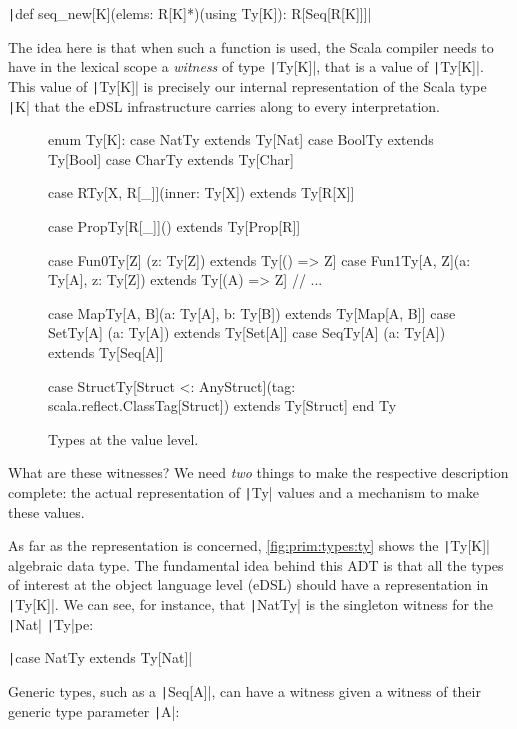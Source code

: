 \documentclass[11pt]{article}
\renewcommand{\vref}[1]{\autoref{#1} \vpageref{#1}}{}
\newcommand{\ScalaI}[1]{\texttt|#1|}
\newcommand{\OneTwoThreeX}[1]{\marginpar{\faCubes{ \smaller #1}}\xspace}
\newcommand{\FirstEtcX}[1]{\marginpar{\faCube{ \smaller #1}}\xspace}
\begin{document}
\ScalaI{def seq_new[K](elems: R[K]*)(using Ty[K]): R[Seq[R[K]]]}

\noindent The idea here is that when such a function is used, the Scala compiler needs to have in the lexical scope a \textit{witness} of type \ScalaI{Ty[K]}, that is a value of \ScalaI{Ty[K]}. This value of \ScalaI{Ty[K]} is precisely our internal representation of the Scala type \ScalaI{K} that the eDSL infrastructure carries along to every interpretation.

\begin{figure}[tb]
\begin{ScalaBlock}
enum Ty[K]:
  case NatTy    extends Ty[Nat]
  case BoolTy   extends Ty[Bool]
  case CharTy   extends Ty[Char]

  case RTy[X, R[_]](inner: Ty[X]) extends Ty[R[X]]
  
  case PropTy[R[_]]() extends Ty[Prop[R]]

  case Fun0Ty[Z]   (z: Ty[Z])           extends Ty[() => Z]
  case Fun1Ty[A, Z](a: Ty[A], z: Ty[Z]) extends Ty[(A) => Z]
  // ...

  case MapTy[A, B](a: Ty[A], b: Ty[B])  extends Ty[Map[A, B]]
  case SetTy[A]   (a: Ty[A])            extends Ty[Set[A]]
  case SeqTy[A]   (a: Ty[A])            extends Ty[Seq[A]]

  case StructTy[Struct <: AnyStruct](tag: scala.reflect.ClassTag[Struct])
      extends Ty[Struct]
end Ty
\end{ScalaBlock}
\caption{Types at the value level.}
\label{fig:prim:types:ty}
\hrulefill
\end{figure}

What are these witnesses? We need \textit{two}\OneTwoThreeX{1,2} things to make the respective description complete: the actual representation of \ScalaI{Ty} values and a mechanism to make these values. 

As far as the representation\FirstEtcX{1} is concerned, \vref{fig:prim:types:ty} shows the \ScalaI{Ty[K]} algebraic data type. The fundamental idea behind this ADT is that all the types of interest at the object language level (eDSL) should have a representation in \ScalaI{Ty[K]}. We can see, for instance, that \ScalaI{NatTy} is the singleton witness for the \ScalaI{Nat} \ScalaI{Ty}pe:

\ScalaI{case NatTy extends Ty[Nat]}

\noindent Generic types, such as a \ScalaI{Seq[A]}, can have a witness given a witness of their generic type parameter \ScalaI{A}:
\end{document}
